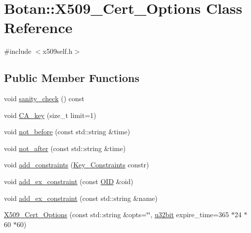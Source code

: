 \hypertarget{classBotan_1_1X509__Cert__Options}{\section{Botan\-:\-:X509\-\_\-\-Cert\-\_\-\-Options Class Reference}
\label{classBotan_1_1X509__Cert__Options}
}


{\ttfamily \#include $<$x509self.\-h$>$}

\subsection*{Public Member Functions}
\begin{DoxyCompactItemize}
\item 
void \hyperlink{classBotan_1_1X509__Cert__Options_adefc221e37e83d069c6acb00eea12fae}{sanity\-\_\-check} () const 
\item 
void \hyperlink{classBotan_1_1X509__Cert__Options_ad7053f5984a749701c65658d0f1d7927}{C\-A\-\_\-key} (size\-\_\-t limit=1)
\item 
void \hyperlink{classBotan_1_1X509__Cert__Options_af3fcfd4f4294731377fa37b468445887}{not\-\_\-before} (const std\-::string \&time)
\item 
void \hyperlink{classBotan_1_1X509__Cert__Options_aeb9173853bce5c3e77be529cf944a043}{not\-\_\-after} (const std\-::string \&time)
\item 
void \hyperlink{classBotan_1_1X509__Cert__Options_a39e583da9120e6e8a682e6df5d241883}{add\-\_\-constraints} (\hyperlink{namespaceBotan_aed0885e5c70627dd43827b966e727654}{Key\-\_\-\-Constraints} constr)
\item 
void \hyperlink{classBotan_1_1X509__Cert__Options_ac986e9af114e178da1abb8014aaf8b08}{add\-\_\-ex\-\_\-constraint} (const \hyperlink{classBotan_1_1OID}{O\-I\-D} \&oid)
\item 
void \hyperlink{classBotan_1_1X509__Cert__Options_a0a80c16b09bb85fbfa07cdd32ca84222}{add\-\_\-ex\-\_\-constraint} (const std\-::string \&name)
\item 
\hyperlink{classBotan_1_1X509__Cert__Options_a8abcd5c6ac0b4934949f01e5e68f76f7}{X509\-\_\-\-Cert\-\_\-\-Options} (const std\-::string \&opts=\char`\"{}\char`\"{}, \hyperlink{namespaceBotan_aacc7d03c95e97e76168fc1c819031830}{u32bit} expire\-\_\-time=365 $\ast$24 $\ast$60 $\ast$60)
\end{DoxyCompactItemize}
